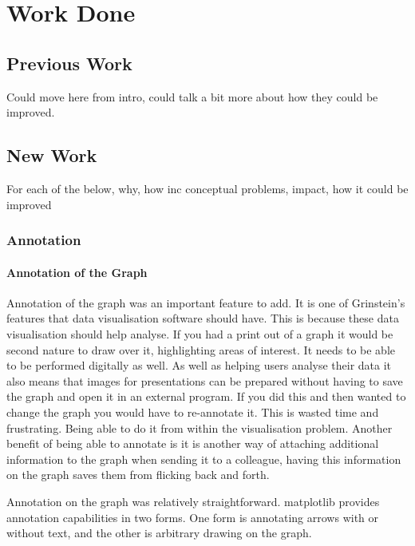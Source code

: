 \section{Work Done}

\subsection{Previous Work}
Could move here from intro, could talk a bit more about how they could be improved.

\subsection{New Work}

For each of the below, why, how inc conceptual problems, impact, how it could be improved

\subsubsection{Annotation}

\paragraph{Annotation of the Graph}

Annotation of the graph was an important feature to add.  It is one of Grinstein's features that data visualisation software should have.  This is because these data visualisation should help analyse.  If you had a print out of a graph it would be second nature to draw over it, highlighting areas of interest.  It needs to be able to be performed digitally as well.  As well as helping users analyse their data it also means that images for presentations can be prepared without having to save the graph and open it in an external program.  If you did this and then wanted to change the graph you would have to re-annotate it.  This is wasted time and frustrating.  Being able to do it from within the visualisation problem.  Another benefit of being able to annotate is it is another way of attaching additional information to the graph when sending it to a colleague, having this information on the graph saves them from flicking back and forth.

Annotation on the graph was relatively straightforward.  matplotlib provides annotation capabilities in two forms.  One form is annotating arrows with or without text, and the other is arbitrary drawing on the graph.

